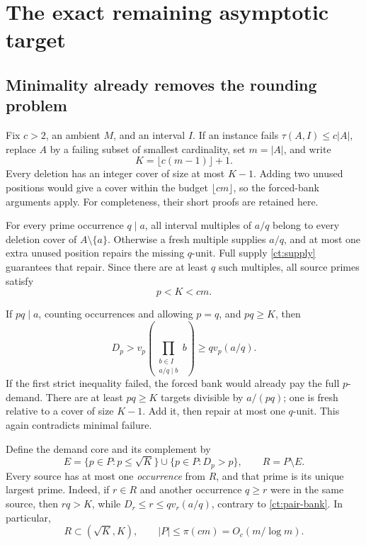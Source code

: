 \section{The exact remaining asymptotic target}
\label{ct:remaining}

\subsection{Minimality already removes the rounding problem}

Fix \(c>2\), an ambient \(M\), and an interval \(I\). If an
instance fails \(\tau(A,I)\le c|A|\), replace \(A\) by a failing
subset of smallest cardinality, set \(m=|A|\), and write
\[
 K=\lfloor c(m-1)\rfloor+1.
\]
Every deletion has an integer cover of size at most \(K-1\).
Adding two unused positions would give a cover within the budget
\(\lfloor cm\rfloor\), so the forced-bank arguments apply.
For completeness, their short proofs are retained here.

For every prime occurrence \(q\mid a\), all interval multiples
of \(a/q\) belong to every deletion cover of \(A\setminus\{a\}\).
Otherwise a fresh multiple supplies \(a/q\), and at most one extra
unused position repairs the missing \(q\)-unit. Full supply
\eqref{ct:supply} guarantees that repair. Since there are at least
\(q\) such multiples, all source primes satisfy
\begin{equation}
 p<K<cm.
 \label{ct:prime-cap}
\end{equation}

If \(pq\mid a\), counting occurrences and allowing \(p=q\),
and \(pq\ge K\), then
\begin{equation}
 D_p>v_p\left(\prod_{\substack{b\in I\\a/q\mid b}}b\right)
 \ge qv_p(a/q).
 \label{ct:pair-bank}
\end{equation}
If the first strict inequality failed, the forced bank would
already pay the full \(p\)-demand. There are at least \(pq\ge K\)
targets divisible by \(a/(pq)\); one is fresh relative to a cover
of size \(K-1\). Add it, then repair at most one \(q\)-unit.
This again contradicts minimal failure.

Define the demand core and its complement by
\begin{equation}
 E=\{p\in P:p\le\sqrt K\}\cup\{p\in P:D_p>p\},
 \qquad R=P\setminus E.
 \label{ct:demand-core}
\end{equation}
Every source has at most one \emph{occurrence} from \(R\), and
that prime is its unique largest prime. Indeed, if \(r\in R\)
and another occurrence \(q\ge r\) were in the same source, then
\(rq>K\), while \(D_r\le r\le qv_r(a/q)\), contrary to
\eqref{ct:pair-bank}. In particular,
\begin{equation}
 R\subset(\sqrt K,K),\qquad
 |P|\le\pi(cm)=O_c(m/\log m).
 \label{ct:round-small}
\end{equation}

